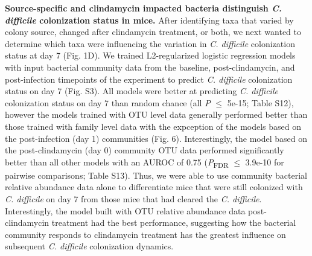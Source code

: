 \documentclass[11pt,]{article}
\begin{document}
\textbf{Source-specific and clindamycin impacted bacteria distinguish
\emph{C. difficile} colonization status in mice.} After identifying taxa
that varied by colony source, changed after clindamycin treatment, or
both, we next wanted to determine which taxa were influencing the
variation in \emph{C. difficile} colonization status at day 7 (Fig. 1D).
We trained L2-regularized logistic regression models with input
bacterial community data from the baseline, post-clindamycin, and
post-infection timepoints of the experiment to predict \emph{C.
difficile} colonization status on day 7 (Fig. S3). All models were
better at predicting \emph{C. difficile} colonization status on day 7
than random chance (all \emph{P} \(\le\) 5e-15; Table S12), however the
models trained with OTU level data generally performed better than those
trained with family level data with the expception of the models based
on the post-infection (day 1) communities (Fig. 6). Interestingly, the
model based on the post-clindamycin (day 0) community OTU data performed
significantly better than all other models with an AUROC of 0.75
(\emph{P}\textsubscript{FDR} \(\le\) 3.9e-10 for pairwise comparisons;
Table S13). Thus, we were able to use community bacterial relative
abundance data alone to differentiate mice that were still colonized
with \emph{C. difficile} on day 7 from those mice that had cleared the
\emph{C. difficile}. Interestingly, the model built with OTU relative
abundance data post-clindamycin treatment had the best performance,
suggesting how the bacterial community responds to clindamycin treatment
has the greatest influence on subsequent \emph{C. difficile}
colonization dynamics.
\end{document}
